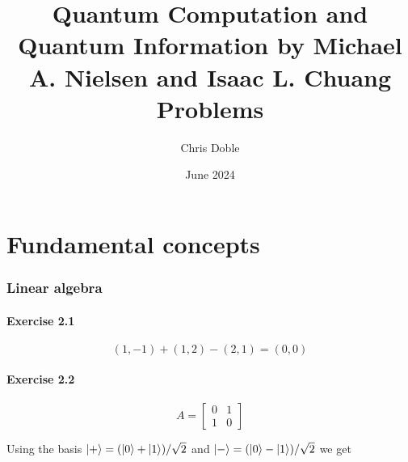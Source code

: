 \documentclass{article}
\title{Quantum Computation and Quantum Information by Michael A. Nielsen and Isaac L. Chuang Problems}
\author{Chris Doble}
\date{June 2024}
\begin{document}
\maketitle

\tableofcontents

\part{Fundamental concepts}

\setcounter{section}{1}
\section{Linear algebra}

\subsection*{Exercise 2.1}

\[(1, -1) + (1, 2) - (2, 1) = (0, 0)\]

\subsection*{Exercise 2.2}

\[A = \begin{bmatrix}
    0 & 1 \\
    1 & 0
  \end{bmatrix}\]

Using the basis $\ket{+} = (\ket{0} + \ket{1}) / \sqrt{2}$ and $\ket{-} = (\ket{0} - \ket{1}) / \sqrt{2}$ we get
\end{document}
